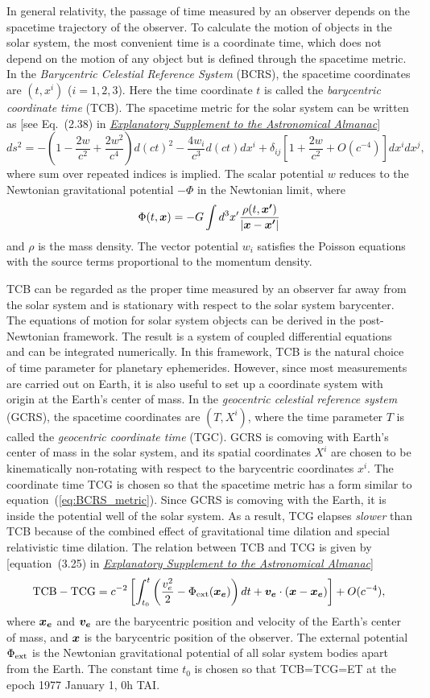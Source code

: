 \documentclass[12pt]{article}
\newcommand \beq {\begin{equation}}
\newcommand \eeq {\end{equation}}
\newcommand{\ve}[1]{\mbox{\boldmath $#1$}}
\newcommand{\expl}{\href{http://www.uscibooks.com/urban.htm}{\it Explanatory Supplement to the Astronomical Almanac}}
\begin{document}
In general relativity, the passage of time measured by an observer depends 
on the spacetime trajectory of the observer. To calculate the motion of objects 
in the solar system, the most convenient time is a coordinate time, which does 
not depend on the motion of any object but is defined through the spacetime metric. 
In the {\em Barycentric Celestial Reference System} (BCRS), the spacetime coordinates 
are $(t,x^i)$ ($i=1,2,3$). Here the time coordinate $t$ is called the {\em barycentric 
coordinate time} (TCB). The spacetime metric for the solar system can be written as 
[see Eq.~(2.38) in \expl]
\beq
  ds^2 = -\left( 1 - \frac{2w}{c^2} + \frac{2w^2}{c^4}\right) d(ct)^2 
- \frac{4 w_i}{c^3} d(ct) dx^i + \delta_{ij}\left[ 1 + \frac{2w}{c^2} 
+ O(c^{-4})\right] dx^i dx^j ,
\label{eq:BCRS_metric}
\eeq
where sum over repeated indices is implied. The scalar potential $w$ reduces to the 
Newtonian gravitational potential $-\Phi$ in the Newtonian limit, where 
\beq
\Phi(t,\ve{x}) = -G\int d^3x' \frac{\rho(t,\ve{x'})}{|\ve{x}-\ve{x'}|} 
\eeq
and $\rho$ is the mass density. The vector potential $w_i$ satisfies 
the Poisson equations with the source terms proportional to the momentum 
density. 

TCB can be regarded as the proper time measured by an observer far away 
from the solar system and is stationary with respect to the solar system 
barycenter. The equations of motion for solar system objects can be 
derived in the post-Newtonian framework. 
The result is a system of coupled differential equations and can be 
integrated numerically. In this framework, TCB is the natural choice of 
time parameter for planetary ephemerides. However, since most measurements 
are carried out on Earth, it is also useful to set up a coordinate system 
with origin at the Earth's center of mass. In the {\em geocentric celestial 
reference system} (GCRS), the spacetime coordinates are $(T,X^i)$, where 
the time parameter $T$ is called the {\em geocentric coordinate time} (TGC). 
GCRS is comoving with Earth's center of mass in the solar system, 
and its spatial coordinates 
$X^i$ are chosen to be kinematically non-rotating with respect to the 
barycentric coordinates $x^i$. The coordinate time TCG is chosen so that 
the spacetime metric has a form similar to equation~(\ref{eq:BCRS_metric}). 
Since GCRS is comoving with the Earth, it is inside the potential well 
of the solar system. As a result, TCG elapses {\em slower} than TCB because 
of the combined effect of gravitational time dilation and special relativistic 
time dilation. The relation between TCB and TCG is given by 
[equation~(3.25) in \expl ]
\beq
  {\rm TCB} - {\rm TCG} = c^{-2} \left[ \int_{t_0}^t \left( \frac{v_e^2}{2} 
- \Phi_{\rm ext}(\ve{x_e}) 
\right) dt + \ve{v_e} \cdot (\ve{x}-\ve{x_e})\right] + O(c^{-4}) ,
\label{eq:TCG}
\eeq
where $\ve{x_e}$ and $\ve{v_e}$ are the barycentric position and velocity of the Earth's 
center of mass, and $\ve{x}$ is the barycentric position of the observer. 
The external potential $\Phi_{\rm ext}$ is the Newtonian gravitational potential 
of all solar system bodies apart from the Earth. The constant time $t_0$ is chosen 
so that TCB=TCG=ET at the epoch 1977 January 1, 0h TAI. 
\end{document}
